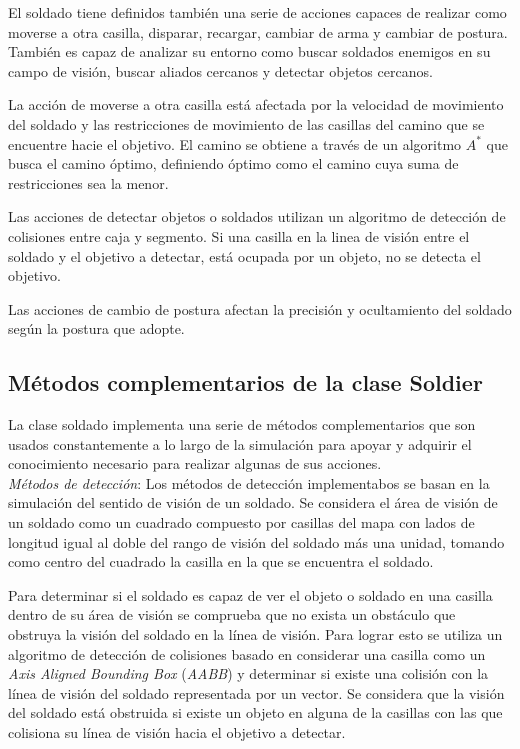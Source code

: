 \documentclass[twoside]{article}
\begin{document}
El soldado tiene definidos tambi\'en una serie de acciones capaces de realizar como moverse a otra casilla, disparar, recargar, cambiar de arma y cambiar de postura. Tambi\'en es capaz de analizar su entorno como buscar soldados enemigos en su campo de visi\'on, buscar aliados cercanos y detectar objetos cercanos.

La acci\'on de moverse a otra casilla est\'a afectada por la velocidad de movimiento del soldado y las restricciones de movimiento de las casillas del camino que se encuentre hacie el objetivo. El camino se obtiene a trav\'es de un algoritmo $A^*$ que busca el camino \'optimo, definiendo \'optimo como el camino cuya suma de restricciones sea la menor.

Las acciones de detectar objetos o soldados utilizan un algoritmo de detecci\'on de colisiones entre caja y segmento. Si una casilla en la linea de visi\'on entre el soldado y el objetivo a detectar, est\'a ocupada por un objeto, no se detecta el objetivo.

Las acciones de cambio de postura afectan la precisi\'on y ocultamiento del soldado seg\'un la postura que adopte.

\subsection{M\'etodos complementarios de la clase Soldier}

La clase soldado implementa una serie de m\'etodos complementarios que son usados constantemente a lo largo de la simulaci\'on para apoyar y adquirir el conocimiento necesario para realizar algunas de sus acciones.\\

\emph{M\'etodos de detecci\'on}: Los m\'etodos de detecci\'on implementabos se basan en la simulaci\'on del sentido de visi\'on de un soldado. Se considera el \'area de visi\'on de un soldado como un cuadrado compuesto por casillas del mapa con lados de longitud igual al doble del rango de visi\'on del soldado m\'as una unidad, tomando como centro del cuadrado la casilla en la que se encuentra el soldado. 

Para determinar si el soldado es capaz de ver el objeto o soldado en una casilla dentro de su \'area de visi\'on se comprueba que no exista un obst\'aculo que obstruya la visi\'on del soldado en la l\'inea de visi\'on. Para lograr esto se utiliza un algoritmo de detecci\'on de colisiones basado en considerar una casilla como un \emph{Axis Aligned Bounding Box} (\emph{AABB}) y determinar si existe una colisi\'on con la l\'inea de visi\'on del soldado representada por un vector. Se considera que la visi\'on del soldado est\'a obstruida si existe un objeto en alguna de la casillas con las que colisiona su l\'inea de visi\'on hacia el objetivo a detectar.
\end{document}
